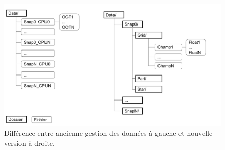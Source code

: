 \begin{figure}
        \includegraphics[width=.95\linewidth]{img/02/data.pdf} 
        \caption[Gestion des IO]{Différence entre ancienne gestion des données à gauche et nouvelle version à droite.
 		\label{fig:data}
 		}
\end{figure}





%


